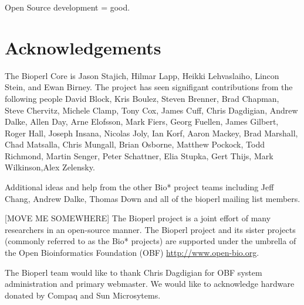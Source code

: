 \documentclass[twocolumn]{article}
\begin{document}
Open Source development = good.

\section{Acknowledgements}

The Bioperl Core is Jason Stajich, Hilmar Lapp, Heikki Lehvaslaiho,
Lincon Stein, and Ewan Birney.  The project has seen signifigant
contributions from the following people David Block, Kris Boulez,
Steven Brenner, Brad Chapman, Steve Chervitz, Michele Clamp, Tony Cox,
James Cuff, Chris Dagdigian, Andrew Dalke, Allen Day, Arne Elofsson,
Mark Fiers, Georg Fuellen, James Gilbert, Roger Hall, Joseph Insana,
Nicolas Joly, Ian Korf, Aaron Mackey, Brad Marshall, Chad Matsalla,
Chris Mungall, Brian Osborne, Matthew Pockock, Todd Richmond, Martin
Senger, Peter Schattner, Elia Stupka, Gert Thijs, Mark Wilkinson,Alex
Zelensky.

Additional ideas and help from the other Bio{*} project teams
including Jeff Chang, Andrew Dalke, Thomas Down and all of the bioperl
mailing list members.


[MOVE ME SOMEWHERE] 
The Bioperl project is a joint effort of many researchers in an
open-source manner.  The Bioperl project and its sister projects
(commonly referred to as the Bio{*} projects) are supported under the
umbrella of the Open Bioinformatics Foundation (OBF)
\url{http://www.open-bio.org}.

The Bioperl team would like to thank Chris Dagdigian for OBF system
administration and primary webmaster.  We would like to acknowledge
hardware donated by Compaq and Sun Microsytems.


 
\end{document}
